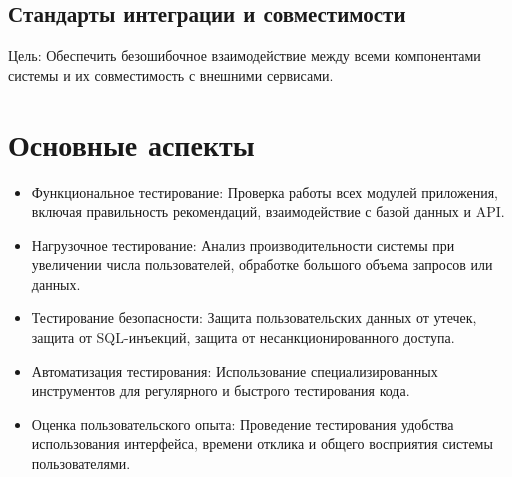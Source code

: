 \subsection{Стандарты интеграции и совместимости}

Цель: Обеспечить безошибочное взаимодействие между всеми компонентами системы и их совместимость с внешними сервисами.
\section*{Основные аспекты}
\begin{itemize}
    \item Функциональное тестирование: Проверка работы всех модулей приложения, включая правильность рекомендаций, взаимодействие с базой данных и API.
    \item Нагрузочное тестирование: Анализ производительности системы при увеличении числа пользователей, обработке большого объема запросов или данных.
    \item Тестирование безопасности: Защита пользовательских данных от утечек, защита от SQL-инъекций, защита от несанкционированного доступа.
    \item Автоматизация тестирования: Использование специализированных инструментов для регулярного и быстрого тестирования кода.
    \item Оценка пользовательского опыта: Проведение тестирования удобства использования интерфейса, времени отклика и общего восприятия системы пользователями.
\end{itemize}